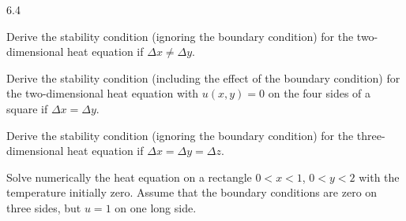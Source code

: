 \begin{exercises}{6.4}
\item[\starred 6.4.1.] Derive the stability condition (ignoring the boundary condition) for the two-dimensional heat equation if $\Delta x \ne \Delta y$.

\item Derive the stability condition (including the effect of the boundary condition) for the two-dimensional heat equation with $u(x,y) = 0$ on the four sides of a square if $\Delta x = \Delta y$.

\item Derive the stability condition (ignoring the boundary condition) for the three-dimensional heat equation if $\Delta x = \Delta y = \Delta z$.

\item Solve numerically the heat equation on a rectangle $0 < x < 1$, $0 < y < 2$ with the temperature initially zero.  Assume that the boundary conditions are zero on three sides, but $u = 1$ on one long side.
\end{exercises}
